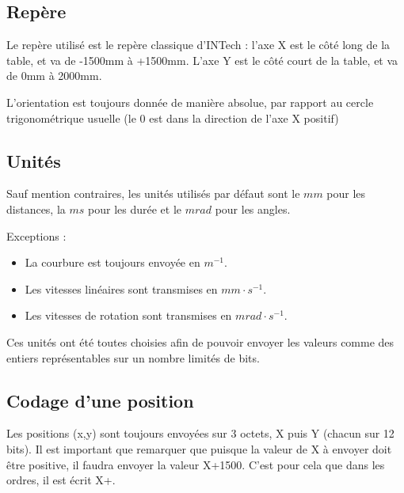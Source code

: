 \documentclass[a4paper, 12pt]{article}
\begin{document}
\subsection{Repère}

Le repère utilisé est le repère classique d'INTech : l'axe X est le côté long de la table, et va de -1500mm à +1500mm. L'axe Y est le côté court de la table, et va de 0mm à 2000mm.

L'orientation est toujours donnée de manière absolue, par rapport au cercle trigonométrique usuelle (le 0 est dans la direction de l'axe X positif)

\subsection{Unités}

Sauf mention contraires, les unités utilisés par défaut sont le $mm$ pour les distances, la $ms$ pour les durée et le $mrad$ pour les angles.

Exceptions :
\begin{itemize}
\item La courbure est toujours envoyée en $m^{-1}$.
\item Les vitesses linéaires sont transmises en $mm \cdot s^{-1}$.
\item Les vitesses de rotation sont transmises en $mrad \cdot s^{-1}$.
\end{itemize}

Ces unités ont été toutes choisies afin de pouvoir envoyer les valeurs comme des entiers représentables sur un nombre limités de bits.

\subsection{Codage d'une position}

Les positions (x,y) sont toujours envoyées sur 3 octets, X puis Y (chacun sur 12 bits). Il est important que remarquer que puisque la valeur de X à envoyer doit être positive, il faudra envoyer la valeur X+1500. C'est pour cela que dans les ordres, il est écrit X+.
\end{document}
